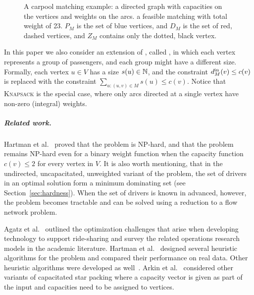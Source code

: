\begin{figure}
\centering

\caption[]{
\label{fig:carpool}
A carpool matching example: 
a directed graph with capacities on the vertices and weights on the arcs. 
a feasible matching with total weight of 23.
$P_M$ is the set of blue vertices, and $D_M$ is the set of red, dashed
vertices, and $Z_M$ contains only the dotted, black vertex.
}
\end{figure}  

In this paper we also consider an extension of \carpool, called \gcp,
in which each vertex represents a group of passengers, and  
each group might have a different size. 
Formally, each vertex $u \in V$ has a size $s(u) \in \N$, 
and the constraint $\din[M](v) \leq c(v)$ is replaced with the constraint
$\sum_{u:(u,v) \in M} s(u) \leq c(v)$.
%
Notice that \textsc{Knapsack} is the special case, where only
arcs directed at a single vertex have non-zero (integral) weights.


\subparagraph{Related work.}
%
Hartman et al.~\cite{hartman2013optimal} proved that the \carpool
problem is NP-hard, and that the problem
remains NP-hard even for a binary weight function when the capacity
function $c(v) \leq 2$ for every vertex in $V$.  It is also worth
mentioning, that in the undirected, uncapacitated, unweighted variant
of the problem, the set of drivers in an optimal solution form a
minimum dominating set (see Section~\ref{sec:hardness}).  When the set
of drivers is known in advanced, however, the problem becomes
tractable and can be solved using a reduction to a flow network
problem.

Agatz et al.~\cite{agatz2012optimization} outlined the optimization
challenges that arise when developing technology to support
ride-sharing and survey the related operations research models in the
academic literature.  Hartman et al.~\cite{hartman2014theory} designed
several heuristic algorithms for the \carpool problem and compared
their performance on real data.  Other heuristic algorithms were
developed as well~\cite{knapen2014exploiting}.  Arkin et
al.~\cite{arkin2004approximations} considered other variants of
capacitated star packing where a capacity vector is given as part of
the input and capacities need to be assigned to vertices.

